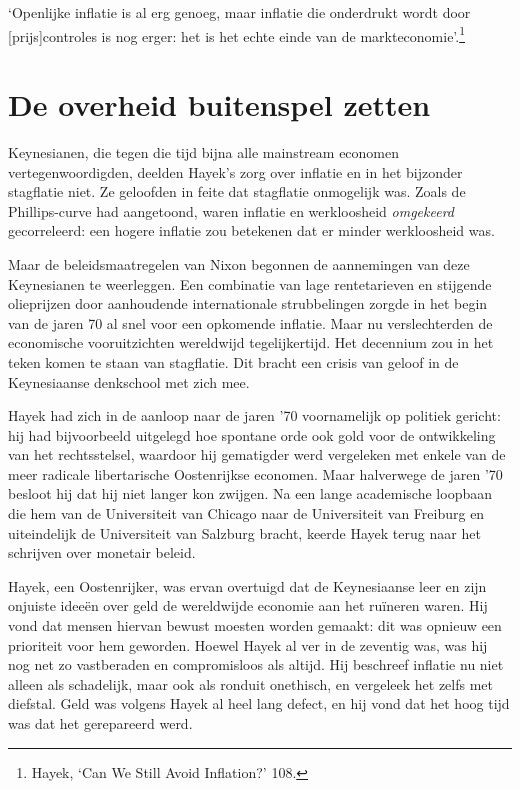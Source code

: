 \documentclass[
  a5paper,
  smalldemyvopaper,11pt,twoside,onecolumn,openright,extrafontsizes]{memoir}
\begin{document}
`Openlijke inflatie is al erg genoeg, maar inflatie die onderdrukt wordt
door {[}prijs{]}controles is nog erger: het is het echte einde van de
markteconomie'.\footnote{\hspace{0pt}Hayek, `Can We Still Avoid
  Inflation?' 108.}

\section{De overheid buitenspel
zetten}\label{de-overheid-buitenspel-zetten}

Keynesianen, die tegen die tijd bijna alle mainstream economen
vertegenwoordigden, deelden Hayek's zorg over inflatie en in het
bijzonder stagflatie niet. Ze geloofden in feite dat stagflatie
onmogelijk was. Zoals de Phillips-curve had aangetoond, waren inflatie
en werkloosheid \emph{omgekeerd} gecorreleerd: een hogere inflatie zou
betekenen dat er minder werkloosheid was.

Maar de beleidsmaatregelen van Nixon begonnen de aannemingen van deze
Keynesianen te weerleggen. Een combinatie van lage rentetarieven en
stijgende olieprijzen door aanhoudende internationale strubbelingen
zorgde in het begin van de jaren 70 al snel voor een opkomende inflatie.
Maar nu verslechterden de economische vooruitzichten wereldwijd
tegelijkertijd. Het decennium zou in het teken komen te staan van
stagflatie. Dit bracht een crisis van geloof in de Keynesiaanse
denkschool met zich mee.

Hayek had zich in de aanloop naar de jaren '70 voornamelijk op politiek
gericht: hij had bijvoorbeeld uitgelegd hoe spontane orde ook gold voor
de ontwikkeling van het rechtsstelsel, waardoor hij gematigder werd
vergeleken met enkele van de meer radicale libertarische Oostenrijkse
economen. Maar halverwege de jaren '70 besloot hij dat hij niet langer
kon zwijgen. Na een lange academische loopbaan die hem van de
Universiteit van Chicago naar de Universiteit van Freiburg en
uiteindelijk de Universiteit van Salzburg bracht, keerde Hayek terug
naar het schrijven over monetair beleid.

Hayek, een Oostenrijker, was ervan overtuigd dat de Keynesiaanse leer en
zijn onjuiste ideeën over geld de wereldwijde economie aan het ruïneren
waren. Hij vond dat mensen hiervan bewust moesten worden gemaakt: dit
was opnieuw een prioriteit voor hem geworden. Hoewel Hayek al ver in de
zeventig was, was hij nog net zo vastberaden en compromisloos als
altijd. Hij beschreef inflatie nu niet alleen als schadelijk, maar ook
als ronduit onethisch, en vergeleek het zelfs met diefstal. Geld was
volgens Hayek al heel lang defect, en hij vond dat het hoog tijd was dat
het gerepareerd werd.
\end{document}
